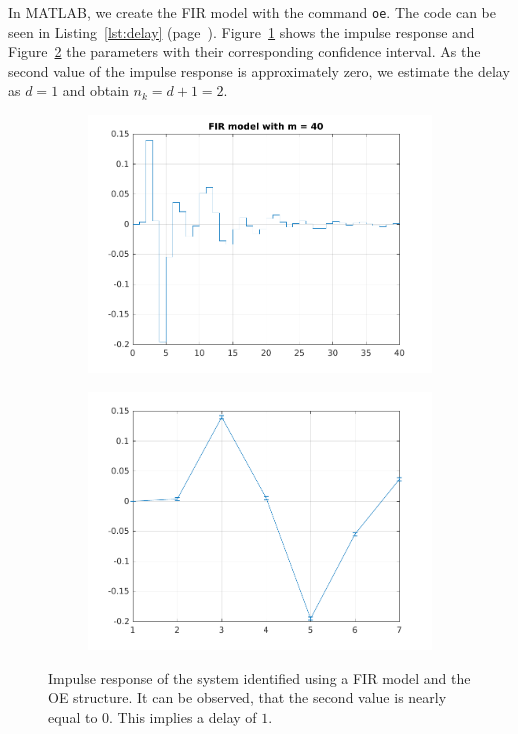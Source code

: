 In MATLAB, we create the FIR model with the command \texttt{oe}. The code can be seen in Listing~\ref{lst:delay} (page~\pageref{lst:delay}).
Figure~\ref{fig:fir40} shows the impulse response and Figure~\ref{fig:fir40_dev} the parameters with their corresponding confidence interval. As the second value of the impulse response is approximately zero, we estimate the delay as $d=1$ and obtain $n_k = d + 1 = 2$. 

\begin{figure}[h]
	\centering
	\begin{subfigure}{.49\textwidth}
		\includegraphics[width=\textwidth]{figures/fir40.pdf}
		\label{fig:fir40}
	\end{subfigure}\hfill
	\begin{subfigure}{.49\textwidth}
		\includegraphics[width=\textwidth]{figures/fir40_dev.pdf}
		\label{fig:fir40_dev}
	\end{subfigure}
	\caption{Impulse response of the system identified using a FIR model and the OE structure. It can be observed, that the second value is nearly equal to $0$. This implies a delay of $1$.}
	\label{fig:delay}
\end{figure}
